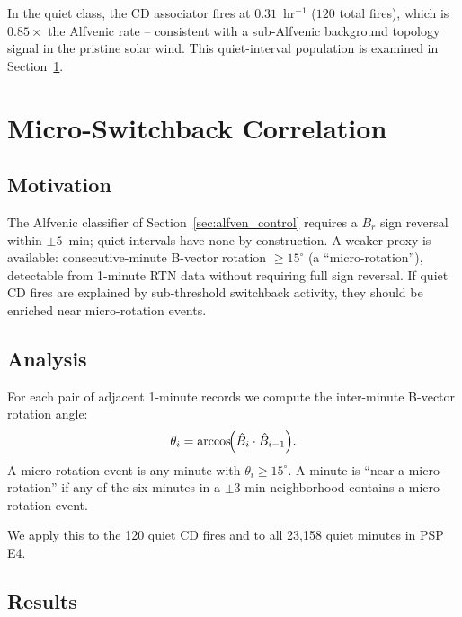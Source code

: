 \documentclass[draft]{agujournal2025}
\begin{document}
In the quiet class, the CD associator fires at $0.31$~hr$^{-1}$ ($120$ total
fires), which is $0.85\times$ the Alfvenic rate -- consistent with a
sub-Alfvenic background topology signal in the pristine solar wind.
This quiet-interval population is examined in Section~\ref{sec:enrichment}.

\section{Micro-Switchback Correlation}
\label{sec:enrichment}

\subsection{Motivation}

The Alfvenic classifier of Section~\ref{sec:alfven_control} requires a $B_r$
sign reversal within $\pm 5$~min; quiet intervals have none by construction.
A weaker proxy is available: consecutive-minute B-vector rotation $\geq 15^\circ$
(a ``micro-rotation''), detectable from 1-minute RTN data without requiring full
sign reversal.  If quiet CD fires are explained by sub-threshold switchback
activity, they should be enriched near micro-rotation events.

\subsection{Analysis}

For each pair of adjacent 1-minute records we compute the inter-minute
B-vector rotation angle:
\begin{equation}
  \theta_i = \arccos\!\Bigl(\hat{B}_i \cdot \hat{B}_{i-1}\Bigr).
  \label{eq:micro_rotation}
\end{equation}
A micro-rotation event is any minute with $\theta_i \geq 15^\circ$.
A minute is ``near a micro-rotation'' if any of the six minutes in a
$\pm 3$-min neighborhood contains a micro-rotation event.

We apply this to the 120 quiet CD fires and to all 23{,}158 quiet minutes
in PSP E4.

\subsection{Results}
\end{document}
